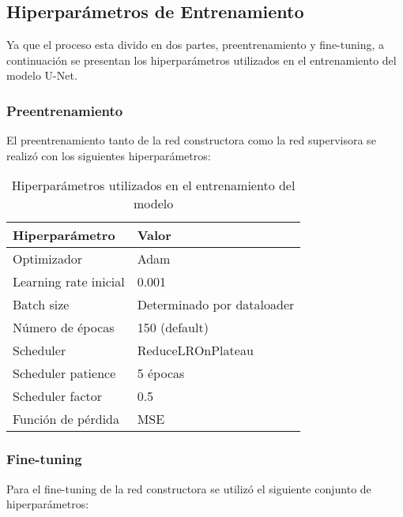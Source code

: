 \subsection{Hiperparámetros de Entrenamiento}
Ya que el proceso esta divido en dos partes, preentrenamiento y fine-tuning, a continuación se presentan los hiperparámetros utilizados en el entrenamiento del modelo U-Net.

\subsubsection{Preentrenamiento} \label{subsubsec:pretraining}

El preentrenamiento tanto de la red constructora como la red supervisora se realizó con los siguientes hiperparámetros:

\begin{table}[H]
    \centering
    \begin{tabular}{ll}
    \hline
    \textbf{Hiperparámetro} & \textbf{Valor} \\
    \hline
    Optimizador & Adam \\
    Learning rate inicial & 0.001 \\
    Batch size & Determinado por dataloader \\
    Número de épocas & 150 (default) \\
    Scheduler & ReduceLROnPlateau \\
    Scheduler patience & 5 épocas \\
    Scheduler factor & 0.5 \\
    Función de pérdida & MSE \\
    \hline
    \end{tabular}
    \caption{Hiperparámetros utilizados en el entrenamiento del modelo}
    \label{tab:hyperparameters}
\end{table}

\subsubsection{Fine-tuning}

Para el fine-tuning de la red constructora se utilizó el siguiente conjunto de hiperparámetros:

